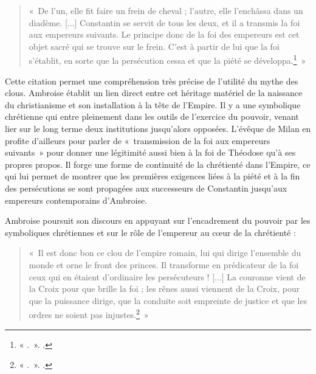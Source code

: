 \begin{quote}
    «~De l’un, elle fit faire un frein de cheval ; l’autre, elle l’enchâssa dans un diadème. [...] Constantin se servit de tous les deux, et il a transmis la foi aux empereurs suivants. Le principe donc de la foi des empereurs est cet objet sacré qui se trouve sur le frein. C’est à partir de lui que la foi s’établit, en sorte que la persécution cessa et que la piété se développa.\footnote{« .~». \cite[]{ambroise_mort_theodose}.}~»
\end{quote}

\bigskip

Cette citation permet une compréhension très précise de l’utilité du mythe des clous. Ambroise établit un lien direct entre cet héritage matériel de la naissance du christianisme et son installation à la tête de l'Empire. Il y a une symbolique chrétienne qui entre pleinement dans les outils de l'exercice du pouvoir, venant lier sur le long terme deux institutions jusqu'alors opposées. L'évêque de Milan en profite d'ailleurs pour parler de «~transmission de la foi aux empereurs suivants~» pour donner une légitimité aussi bien à la foi de Théodose qu'à ses propres propos. Il forge une forme de continuité de la chrétienté dans l'Empire, ce qui lui permet de montrer que les premières exigences liées à la piété et à la fin des persécutions se sont propagées aux successeurs de Constantin jusqu'aux empereurs contemporains d'Ambroise.

\bigskip

Ambroise poursuit son discours en appuyant sur l'encadrement du pouvoir par les symboliques chrétiennes et sur le rôle de l'empereur au cœur de la chrétienté :

\bigskip

\begin{quote}
    «~Il est donc bon ce clou de l’empire romain, lui qui dirige l’ensemble du monde et orne le front des princes. Il transforme en prédicateur de la foi ceux qui en étaient d’ordinaire les persécuteurs ! [...] La couronne vient de la Croix pour que brille la foi ; les rênes aussi viennent de la Croix, pour que la puissance dirige, que la conduite soit empreinte de justice et que les ordres ne soient pas injustes.\footnote{« .~». \cite[]{ambroise_mort_theodose}.}~»
\end{quote}

